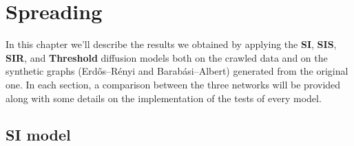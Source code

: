 \chapter{Spreading} %
\label{cha:spreading}

In this chapter we'll describe the results we obtained by applying the \textbf{SI}, \textbf{SIS}, \textbf{SIR},
and \textbf{Threshold} diffusion models both on the crawled data and on the synthetic graphs (Erdős–Rényi and
Barabási–Albert) generated from the original one. In each section, a comparison between the three networks will be
provided along with some details on the implementation of the tests of every model.

\section{SI model} %
\label{sec:si_model}
